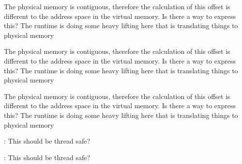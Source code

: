 \begin{DoxyRefList}
\item[Member \mbox{\hyperlink{class_up_down_1_1_sim_u_d_runtime__t_a112bba7e502827b810ab98efbf114298}{Up\+Down\+::Sim\+UDRuntime\+\_\+t\+::test\+\_\+addr}} (uint8\+\_\+t ud\+\_\+id, uint8\+\_\+t lane\+\_\+num, uint32\+\_\+t offset, word\+\_\+t expected=1)]\label{todo__todo000011}%
%
The physical memory is contiguous, therefore the calculation of this offset is different to the address space in the virtual memory. Is there a way to express this? The runtime is doing some heavy lifting here that is translating things to physical memory  
\item[Member \mbox{\hyperlink{class_up_down_1_1_sim_u_d_runtime__t_a32ebe16466d123ae02b3f0a56f159e1d}{Up\+Down\+::Sim\+UDRuntime\+\_\+t\+::test\+\_\+wait\+\_\+addr}} (uint8\+\_\+t ud\+\_\+id, uint8\+\_\+t lane\+\_\+num, uint32\+\_\+t offset, word\+\_\+t expected=1)]\label{todo__todo000012}%
%
The physical memory is contiguous, therefore the calculation of this offset is different to the address space in the virtual memory. Is there a way to express this? The runtime is doing some heavy lifting here that is translating things to physical memory  
\item[Member \mbox{\hyperlink{class_up_down_1_1_sim_u_d_runtime__t_a8b07d604450dde8d4754aa24e6c0fca2}{Up\+Down\+::Sim\+UDRuntime\+\_\+t\+::ud2t\+\_\+memcpy}} (ptr\+\_\+t data, uint64\+\_\+t size, uint8\+\_\+t ud\+\_\+id, uint8\+\_\+t lane\+\_\+num, uint32\+\_\+t offset)]\label{todo__todo000010}%
%
The physical memory is contiguous, therefore the calculation of this offset is different to the address space in the virtual memory. Is there a way to express this? The runtime is doing some heavy lifting here that is translating things to physical memory  
\item[Member \mbox{\hyperlink{class_up_down_1_1_u_d_runtime__t_aa02ee38bf2166f297f40176c88485c1a}{Up\+Down\+::UDRuntime\+\_\+t\+::mm\+\_\+free}} (void $\ast$ptr)]\label{todo__todo000005}%
%
\+: This should be thread safe? 
\item[Member \mbox{\hyperlink{class_up_down_1_1_u_d_runtime__t_a3f6d1895e3d1ad7fc40b918154a027ad}{Up\+Down\+::UDRuntime\+\_\+t\+::mm\+\_\+malloc}} (uint64\+\_\+t size)]\label{todo__todo000004}%
%
\+: This should be thread safe?
\end{DoxyRefList}